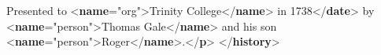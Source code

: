 \begin{shaded}
\mbox{}\newline 
{}\mbox{}\newline 
\hspace*{1em}Presented to {<\textbf{name}\hspace*{1em}{type}="{org}">}Trinity College{</\textbf{name}>} in\mbox{}\newline 
\hspace*{1em}1738{</\textbf{date}>} by {<\textbf{name}\hspace*{1em}{type}="{person}">}Thomas Gale{</\textbf{name}>} and his son {<\textbf{name}\hspace*{1em}{type}="{person}">}Roger{</\textbf{name}>}.{</\textbf{p}>}\mbox{}\newline 
{}\mbox{}\newline 
{</\textbf{history}>}\end{shaded}\egroup\par \par
